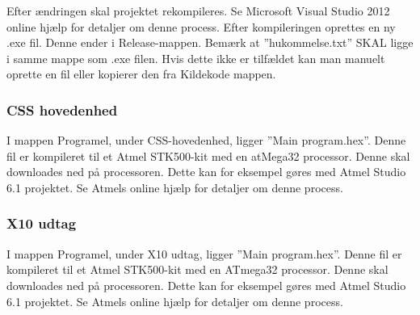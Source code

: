 Efter ændringen skal projektet rekompileres. Se Microsoft Visual Studio 2012 online hjælp for detaljer om denne process. Efter kompileringen oprettes en ny .exe fil. Denne ender i Release-mappen. Bemærk at ''hukommelse.txt'' SKAL ligge i samme mappe som .exe filen. Hvis dette ikke er tilfældet kan man manuelt oprette en fil eller kopierer den fra Kildekode mappen.

\subsubsection{CSS hovedenhed}
I mappen Programel, under CSS-hovedenhed, ligger ''Main program.hex''. Denne fil er kompileret til et Atmel STK500-kit med en atMega32 processor. Denne skal downloades ned på processoren. Dette kan for eksempel gøres med Atmel Studio 6.1 projektet. Se Atmels online hjælp for detaljer om denne process.

\subsubsection{X10 udtag}
I mappen Programel, under X10 udtag, ligger ''Main program.hex''. Denne fil er kompileret til et Atmel STK500-kit med en ATmega32 processor. Denne skal downloades ned på processoren. Dette kan for eksempel gøres med Atmel Studio 6.1 projektet. Se Atmels online hjælp for detaljer om denne process.